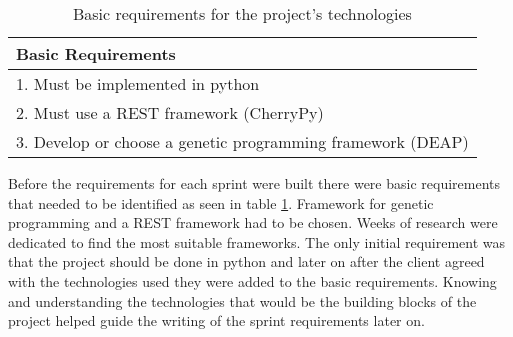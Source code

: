 \begin{table}[ht] 
\caption{Basic requirements for the project's technologies} %
\centering %
\begin{tabular}{l} %
\hline\hline %
Basic Requirements \\ [0.5ex] %
\hline %
1. Must be implemented in python \\
2. Must use a REST framework (CherryPy) \\
3. Develop or choose a genetic programming framework (DEAP) \\
\hline %
\end{tabular} 
\label{table:breq} %
\end{table}

Before the requirements for each sprint were built there were basic requirements that needed to be identified as seen in table \ref{table:breq}. 
Framework for genetic programming and a REST framework had to be chosen. Weeks of research were dedicated to find the most suitable frameworks.
The only initial requirement was that the project should be done in python and later on after the client agreed with the technologies used they
were  added to the basic requirements. Knowing and understanding the technologies that would be the building blocks of the project helped guide 
the writing of the sprint requirements later on.

